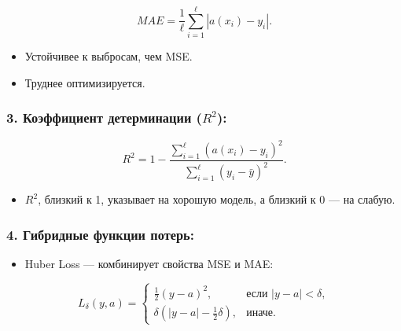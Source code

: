\begin{equation}
MAE = \frac{1}{\ell} \sum_{i=1}^{\ell} |a(x_i) - y_i|.
\end{equation}

\begin{itemize}
\tightlist
\item
  Устойчивее к выбросам, чем MSE.
\item
  Труднее оптимизируется.
\end{itemize}

\hypertarget{ux43aux43eux44dux444ux444ux438ux446ux438ux435ux43dux442-ux434ux435ux442ux435ux440ux43cux438ux43dux430ux446ux438ux438-r2}{%
\subsubsection*{\texorpdfstring{3. Коэффициент детерминации
(\(R^2\)):}{3. Коэффициент детерминации (R\^{}2):}}\label{ux43aux43eux44dux444ux444ux438ux446ux438ux435ux43dux442-ux434ux435ux442ux435ux440ux43cux438ux43dux430ux446ux438ux438-r2}}

\begin{equation}
R^2 = 1 - \frac{\sum_{i=1}^{\ell} (a(x_i) - y_i)^2}{\sum_{i=1}^{\ell} (y_i - \bar{y})^2}.
\end{equation}

\begin{itemize}
\tightlist
\item
  \(R^2\), близкий к 1, указывает на хорошую модель, а близкий к 0 ---
  на слабую.
\end{itemize}

\hypertarget{ux433ux438ux431ux440ux438ux434ux43dux44bux435-ux444ux443ux43dux43aux446ux438ux438-ux43fux43eux442ux435ux440ux44c}{%
\subsubsection*{4. Гибридные функции
потерь:}\label{ux433ux438ux431ux440ux438ux434ux43dux44bux435-ux444ux443ux43dux43aux446ux438ux438-ux43fux43eux442ux435ux440ux44c}}

\begin{itemize}
\tightlist
\item
  Huber Loss --- комбинирует свойства MSE и MAE:
\end{itemize}

\begin{equation}
L_\delta(y, a) = 
\begin{cases} 
\frac{1}{2}(y - a)^2, & \text{если } |y - a| < \delta, \\
\delta (|y - a| - \frac{1}{2}\delta), & \text{иначе}.
\end{cases}
\end{equation}

